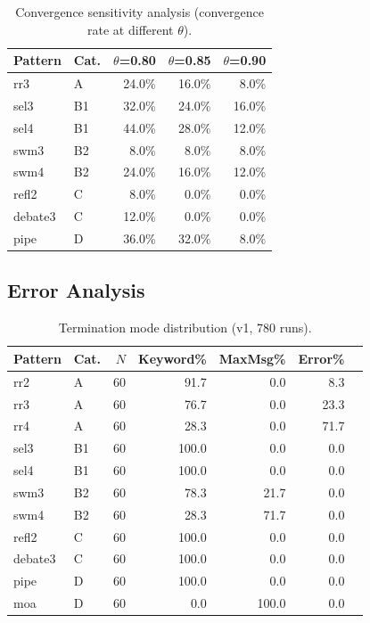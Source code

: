 \documentclass{article}
\begin{document}
\begin{table}[H]
\centering
\caption{Convergence sensitivity analysis (convergence rate at different $\theta$).}
\label{tab:convergence_sensitivity}
{\small
\begin{tabular}{@{}llrrr@{}}
\toprule
\textbf{Pattern} & \textbf{Cat.} & $\theta$=0.80 & $\theta$=0.85 & $\theta$=0.90 \\
\midrule
rr3 & A & 24.0\% & 16.0\% & 8.0\% \\
sel3 & B1 & 32.0\% & 24.0\% & 16.0\% \\
sel4 & B1 & 44.0\% & 28.0\% & 12.0\% \\
swm3 & B2 & 8.0\% & 8.0\% & 8.0\% \\
swm4 & B2 & 24.0\% & 16.0\% & 12.0\% \\
refl2 & C & 8.0\% & 0.0\% & 0.0\% \\
debate3 & C & 12.0\% & 0.0\% & 0.0\% \\
pipe & D & 36.0\% & 32.0\% & 8.0\% \\
\bottomrule
\end{tabular}
}
\end{table}

\subsection{Error Analysis}
\label{app:errors}

\begin{table}[H]
\centering
\caption{Termination mode distribution (v1, 780 runs).}
\label{tab:termination_modes}
{\small
\begin{tabular}{@{}llrrrrr@{}}
\toprule
\textbf{Pattern} & \textbf{Cat.} & $N$ & \textbf{Keyword\%} & \textbf{MaxMsg\%} & \textbf{Error\%} \\
\midrule
rr2 & A & 60 & 91.7 & 0.0 & 8.3 \\
rr3 & A & 60 & 76.7 & 0.0 & 23.3 \\
rr4 & A & 60 & 28.3 & 0.0 & 71.7 \\
sel3 & B1 & 60 & 100.0 & 0.0 & 0.0 \\
sel4 & B1 & 60 & 100.0 & 0.0 & 0.0 \\
swm3 & B2 & 60 & 78.3 & 21.7 & 0.0 \\
swm4 & B2 & 60 & 28.3 & 71.7 & 0.0 \\
refl2 & C & 60 & 100.0 & 0.0 & 0.0 \\
debate3 & C & 60 & 100.0 & 0.0 & 0.0 \\
pipe & D & 60 & 100.0 & 0.0 & 0.0 \\
moa & D & 60 & 0.0 & 100.0 & 0.0 \\
\bottomrule
\end{tabular}
}
\end{table}
\end{document}
